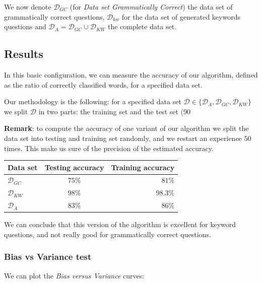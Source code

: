 We now denote $\mathcal{D}_{GC}$ (for \textit{Data set Grammatically Correct}) the data set of grammatically correct questions, $\mathcal{D}_{kw}$ for the data set of generated keywords questions and $\mathcal{D}_A = \mathcal{D}_{GC} \cup  \mathcal{D}_{KW}$ the complete data set.

\subsection{Results}

In this basic configuration, we can measure the accuracy of our algorithm, defined as the ratio of correctly classified words, for a specified data set.

Our methodology is the following: for a specified data set $\mathcal{D} \in \{\mathcal{D}_A, \mathcal{D}_{GC}, \mathcal{D}_{KW}\}$ we split $\mathcal{D}$ in two parts: the training set and the test set (90%

\textbf{Remark}: to compute the accuracy of one variant of our algorithm we split the data set into testing and training set randomly, and we restart an experience 50 times. This make us sure of the precision of the estimated accuracy.

\begin{center}
\begin{tabular}{|l|c|r|}
  \hline
  Data set &  Testing accuracy  & Training accuracy \\
  \hline
  $\mathcal{D}_{GC}$ &  $75\%$& $81\%$  \\
  $\mathcal{D}_{KW}$ & $98\%$ & $98.3\%$ \\
  $\mathcal{D}_{A}$    & $83\%$ & $86\%$ \\
  \hline
\end{tabular}
\end{center}

We can conclude that this version of the algorithm is excellent for keyword questions, and not really good for grammatically correct questions.

\subsubsection{Bias vs Variance test}

We can plot the \textit{Bias versus Variance} curves:

